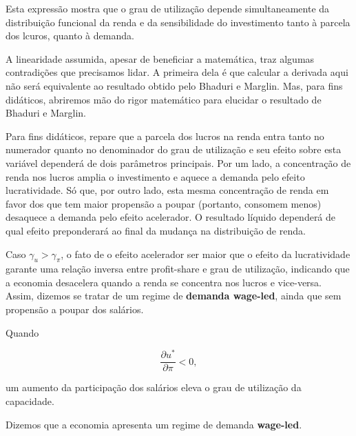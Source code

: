 \documentclass[
  brazilian,
  letterpaper,
  DIV=11,
  numbers=noendperiod]{scrreprt}
\begin{document}
Esta expressão mostra que o grau de utilização depende simultaneamente
da distribuição funcional da renda e da sensibilidade do investimento
tanto à parcela dos lcuros, quanto à demanda.

A linearidade assumida, apesar de beneficiar a matemática, traz algumas
contradições que precisamos lidar. A primeira dela é que calcular a
derivada aqui não será equivalente ao resultado obtido pelo Bhaduri e
Marglin. Mas, para fins didáticos, abriremos mão do rigor matemático
para elucidar o resultado de Bhaduri e Marglin.

Para fins didáticos, repare que a parcela dos lucros na renda entra
tanto no numerador quanto no denominador do grau de utilização e seu
efeito sobre esta variável dependerá de dois parâmetros principais. Por
um lado, a concentração de renda nos lucros amplia o investimento e
aquece a demanda pelo efeito lucratividade. Só que, por outro lado, esta
mesma concentração de renda em favor dos que tem maior propensão a
poupar (portanto, consomem menos) desaquece a demanda pelo efeito
acelerador. O resultado líquido dependerá de qual efeito preponderará ao
final da mudança na distribuição de renda.

Caso \(\gamma_u > \gamma_\pi\), o fato de o efeito acelerador ser maior
que o efeito da lucratividade garante uma relação inversa entre
profit-share e grau de utilização, indicando que a economia desacelera
quando a renda se concentra nos lucros e vice-versa. Assim, dizemos se
tratar de um regime de \textbf{demanda wage-led}, ainda que sem
propensão a poupar dos salários.

\begin{tcolorbox}[enhanced jigsaw, arc=.35mm, bottomrule=.15mm, bottomtitle=1mm, breakable, colback=white, colbacktitle=quarto-callout-note-color!10!white, colframe=quarto-callout-note-color-frame, coltitle=black, left=2mm, leftrule=.75mm, opacityback=0, opacitybacktitle=0.6, rightrule=.15mm, title=\textcolor{quarto-callout-note-color}{\faInfo}\hspace{0.5em}{Regime de demanda \emph{wage-led}}, titlerule=0mm, toprule=.15mm, toptitle=1mm]

Quando

\[\frac{\partial u^{*}}{\partial\pi}<0,\]

um aumento da participação dos salários eleva o grau de utilização da
capacidade.

Dizemos que a economia apresenta um regime de demanda \textbf{wage-led}.

\end{tcolorbox}
\end{document}
